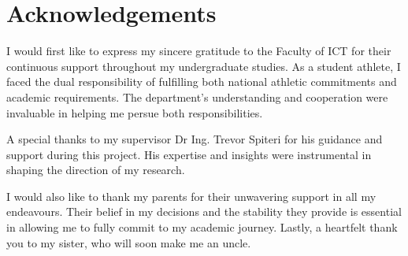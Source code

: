 \chapter*{Acknowledgements}

I would first like to express my sincere gratitude to the Faculty of ICT for their continuous support throughout my undergraduate studies. As a student athlete, I faced the dual responsibility of fulfilling both national athletic commitments and academic requirements. The department’s understanding and cooperation were invaluable in helping me persue both responsibilities.

A special thanks to my supervisor Dr Ing. Trevor Spiteri for his guidance and support during this project. His expertise and insights were instrumental in shaping the direction of my research. 

I would also like to thank my parents for their unwavering support in all my endeavours. Their belief in my decisions and the stability they provide is essential in allowing me to fully commit to my academic journey. Lastly, a heartfelt thank you to my sister, who will soon make me an uncle.
